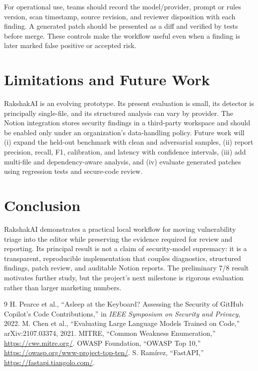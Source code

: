 \documentclass[10pt,conference]{IEEEtran}
\begin{document}
For operational use, teams should record the model/provider, prompt or rules version, scan timestamp, source revision, and reviewer disposition with each finding. A generated patch should be presented as a diff and verified by tests before merge. These controls make the workflow useful even when a finding is later marked false positive or accepted risk.

\section{Limitations and Future Work}
RakshakAI is an evolving prototype. Its present evaluation is small, its detector is principally single-file, and its structured analysis can vary by provider. The Notion integration stores security findings in a third-party workspace and should be enabled only under an organization's data-handling policy. Future work will (i) expand the held-out benchmark with clean and adversarial samples, (ii) report precision, recall, F1, calibration, and latency with confidence intervals, (iii) add multi-file and dependency-aware analysis, and (iv) evaluate generated patches using regression tests and secure-code review.

\section{Conclusion}
RakshakAI demonstrates a practical local workflow for moving vulnerability triage into the editor while preserving the evidence required for review and reporting. Its principal result is not a claim of security-model supremacy: it is a transparent, reproducible implementation that couples diagnostics, structured findings, patch review, and auditable Notion reports. The preliminary 7/8 result motivates further study, but the project's next milestone is rigorous evaluation rather than larger marketing numbers.

\begin{thebibliography}{9}
 H. Pearce et al., ``Asleep at the Keyboard? Assessing the Security of GitHub Copilot's Code Contributions,'' in \emph{IEEE Symposium on Security and Privacy}, 2022.
 M. Chen et al., ``Evaluating Large Language Models Trained on Code,'' arXiv:2107.03374, 2021.
 MITRE, ``Common Weakness Enumeration,'' \url{https://cwe.mitre.org/}.
 OWASP Foundation, ``OWASP Top 10,'' \url{https://owasp.org/www-project-top-ten/}.
 S. Ram\'irez, ``FastAPI,'' \url{https://fastapi.tiangolo.com/}.
\end{thebibliography}
\end{document}
